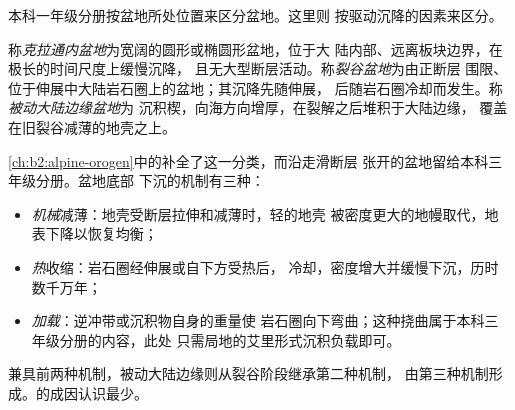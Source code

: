 本科一年级分册按盆地所处位置来区分盆地。这里则
按驱动沉降的因素来区分。

\begin{definition}\label{def:b2:basins-compared:types}
称\emph{克拉通内盆地}为宽阔的圆形或椭圆形盆地，位于大
陆内部、远离板块边界，在极长的时间尺度上缓慢沉降，
且无大型断层活动。称\emph{裂谷盆地}为由正断层
围限、位于伸展中大陆岩石圈上的盆地；其沉降先随伸展，
后随岩石圈冷却而发生。称\emph{被动大陆边缘盆地}为
沉积楔，向海方向增厚，在裂解之后堆积于大陆边缘，
覆盖在旧裂谷减薄的地壳之上。
\end{definition}

\cref{ch:b2:alpine-orogen}中的补全了这一分类，而沿走滑断层
张开的盆地留给本科三年级分册。盆地底部
下沉的机制有三种：
\begin{itemize}
  \item \emph{机械}减薄：地壳受断层拉伸和减薄时，轻的地壳
        被密度更大的地幔取代，地表下降以恢复均衡；
  \item \emph{热}收缩：岩石圈经伸展或自下方受热后，
        冷却，密度增大并缓慢下沉，历时数千万年；
  \item \emph{加载}：逆冲带或沉积物自身的重量使
        岩石圈向下弯曲；这种挠曲属于本科三年级分册的内容，此处
        只需局地的艾里形式沉积负载即可。
\end{itemize}
兼具前两种机制，被动大陆边缘则从裂谷阶段继承第二种机制，
由第三种机制形成。的成因认识最少。

